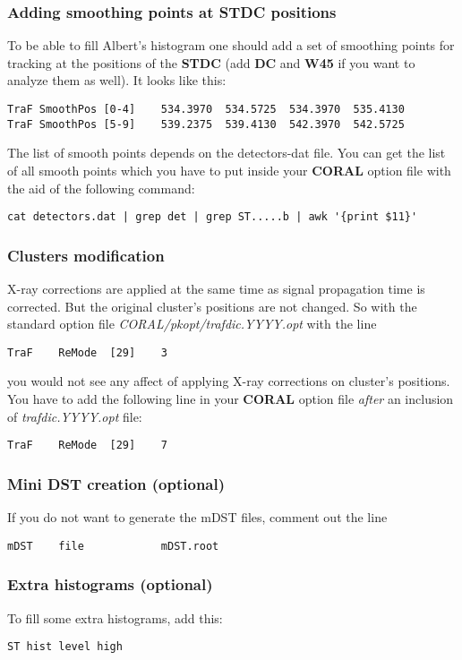 \documentclass[a4paper,12pt]{article}
\begin{document}
\subsubsection{Adding smoothing points at {\bf STDC} positions}
To be able to fill Albert's histogram one should add a set of smoothing points for tracking at the positions
of the {\bf STDC} (add {\bf DC} and {\bf W45} if you want to analyze them as well). It looks like this:
\begin{verbatim}
TraF SmoothPos [0-4]    534.3970  534.5725  534.3970  535.4130
TraF SmoothPos [5-9]    539.2375  539.4130  542.3970  542.5725
\end{verbatim}
The list of smooth points depends on the detectors-dat file. You can get the list of all smooth points
which you have to put inside your {\bf CORAL} option file with the aid of the following command:
\begin{verbatim}
cat detectors.dat | grep det | grep ST.....b | awk '{print $11}'
\end{verbatim}

\subsubsection{Clusters modification}
X-ray corrections are applied at the same time as signal propagation time is
corrected. But the original cluster's positions are not changed. So with the
standard option file {\it CORAL/pkopt/trafdic.YYYY.opt} with the line
\begin{verbatim}
TraF	ReMode	[29]	3
\end{verbatim}
you would not see any affect of applying X-ray corrections on cluster's positions.
You have to add the following
line in your {\bf CORAL} option file {\it after} an inclusion of {\it trafdic.YYYY.opt} file:
\begin{verbatim}
TraF	ReMode	[29]	7
\end{verbatim}

\subsubsection{Mini DST creation (optional)}
If you do not want to generate the mDST files, comment out the line
\begin{verbatim}
mDST    file            mDST.root
\end{verbatim}

\subsubsection{Extra histograms (optional)}
To fill some extra histograms, add this:
\begin{verbatim}
ST hist level high
\end{verbatim}
\end{document}
